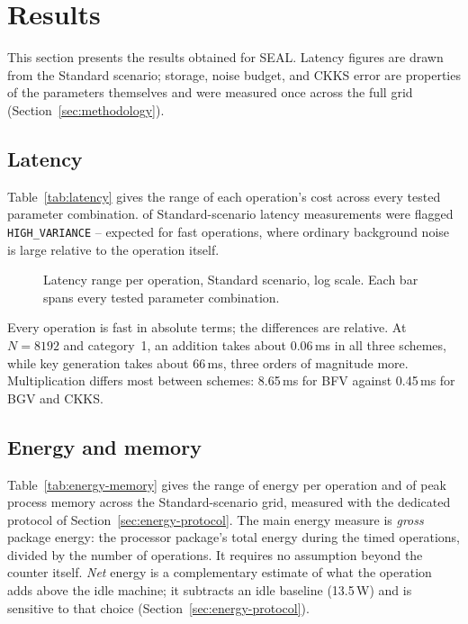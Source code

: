 \section{Results}
\label{sec:results}

This section presents the results obtained for SEAL. Latency figures are drawn from the Standard scenario; storage, noise budget, and CKKS error are properties of the parameters themselves and were measured once across the full grid (Section~\ref{sec:methodology}).

\subsection{Latency}

Table~\ref{tab:latency} gives the range of each operation's cost across every tested parameter combination. \hvStd{} of \nStd{} Standard-scenario latency measurements were flagged \texttt{HIGH\_VARIANCE} -- expected for fast operations, where ordinary background noise is large relative to the operation itself.

\begin{table}[h!]
\centering\small

\caption{Latency range per operation, Standard scenario, over every measured parameter combination ($N \le 8192$ plus $N{=}16384$/category~1; mean of 100 runs per cell).}
\label{tab:latency}
\end{table}

\begin{figure}[h!]
\centering

\caption{Latency range per operation, Standard scenario, log scale. Each bar spans every tested parameter combination.}
\label{fig:latency}
\end{figure}

Every operation is fast in absolute terms; the differences are relative. At $N{=}8192$ and category~1, an addition takes about 0.06\,ms in all three schemes, while key generation takes about 66\,ms, three orders of magnitude more. Multiplication differs most between schemes: 8.65\,ms for BFV against 0.45\,ms for BGV and CKKS.

\subsection{Energy and memory}
\label{sec:energy-memory}

Table~\ref{tab:energy-memory} gives the range of energy per operation and of peak process memory across the Standard-scenario grid, measured with the dedicated protocol of Section~\ref{sec:energy-protocol}. The main energy measure is \emph{gross} package energy: the processor package's total energy during the timed operations, divided by the number of operations. It requires no assumption beyond the counter itself. \emph{Net} energy is a complementary estimate of what the operation adds above the idle machine; it subtracts an idle baseline (13.5\,W) and is sensitive to that choice (Section~\ref{sec:energy-protocol}).

